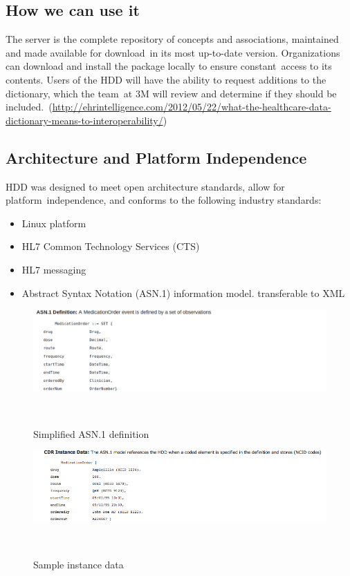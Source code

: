 \documentclass[DIV=calc, paper=a4, fontsize=12pt, onecolumn]{scrartcl}	 %
\begin{document}
  \subsection{How we can use it}
  The server is the complete repository of concepts and associations, maintained and made available for download\
  in its most up-to-date version. Organizations can download and install the package locally to ensure constant\ 
  access to its contents. Users of the HDD will have the ability to request additions to the dictionary, which the team\
  at 3M will review and determine if they should be included.\
  (\url{http://ehrintelligence.com/2012/05/22/what-the-healthcare-data-dictionary-means-to-interoperability/}) 

  \subsection{Architecture and Platform Independence}
  HDD was designed to meet open architecture standards, allow for platform\
  independence, and conforms to the following industry standards:\
  \begin{itemize}
    \itemsep0ex
    \item Linux platform\
    \item HL7 Common Technology Services (CTS)\
    \item HL7 messaging\
    \item Abstract Syntax Notation (ASN.1) information model. transferable to XML\ 
  \end{itemize}

  \begin{figure}[ht!]
    \label{fig:asn}
    \centering
    \includegraphics[scale=0.4]{asn.png}
    \caption{Simplified ASN.1 definition}\
  \end{figure}  

  \begin{figure}[ht!]
    \label{fig:sid}
    \centering
    \includegraphics[scale=0.6]{sid.png}
    \caption{Sample instance data}\
  \end{figure}  
 
\end{document}
